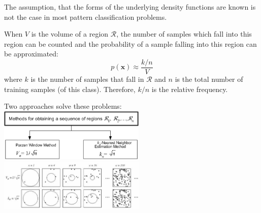   The assumption, that the forms of the underlying density functions are known is not the case in 
  most pattern classification problems.
  
  
  When $V$ is the volume of a region $\mathcal{R}$, the number of samples which fall into this
  region can be counted and the probability of a sample falling into this region can be 
  approximated:
  $$p(\bm{x}) \approx \frac{k/n}{V}$$
  where $k$ is the number of samples that fall in $\mathcal{R}$ and $n$ is the total number of training
  samples (of this class). Therefore, $k/n$ is the relative frequency.
  
  Two approaches solve these problems:\\
  \includegraphics[width=7cm]{./images/non-parametric_methods_1.png}
  \includegraphics[width=7cm]{./images/non-parametric_methods_2.jpg}
  
